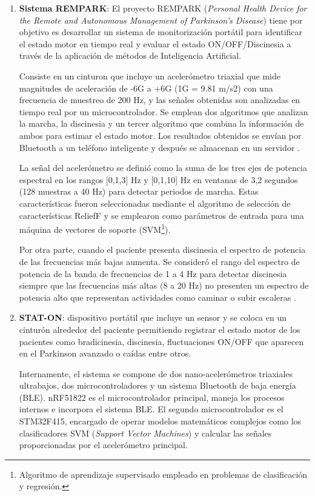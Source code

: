 \begin{enumerate}
    \item \textbf{Sistema REMPARK}: El proyecto REMPARK (\textit{Personal Health Device for the Remote and Autonomous Management of Parkinson's Disease}) tiene por objetivo es desarrollar un sistema de monitorización portátil para identificar el estado motor en tiempo real y evaluar el estado ON/OFF/Discinesia a través de la aplicación de métodos de Inteligencia Artificial.

    Consiste en un cinturon que incluye un acelerómetro triaxial que mide magnitudes de aceleración de -6G a +6G (1G = 9.81 m/s2) con una frecuencia de muestreo de 200 Hz, y las señales obtenidas son analizadas en tiempo real por un microcontrolador. Se emplean dos algoritmos que analizan la marcha, la discinesia y un tercer algoritmo que combina la información de ambos para estimar el estado motor. Los resultados obtenidos se envían por Bluetooth a un teléfono inteligente y después se almacenan en un servidor \cite{bayes2018holter, cabestany2013rempark}.

    La señal del acelerómetro se definió como la suma de los tres ejes de potencia espectral en los rangos [0,1,3] Hz y [0,1,10] Hz en ventanas de 3,2 segundos (128 muestras a 40 Hz) para detectar periodos de marcha. Estas características fueron seleccionadas mediante el algoritmo de selección de características ReliefF y se emplearon como parámetros de entrada para una máquina de vectores de soporte (SVM\footnote{Algoritmo de aprendizaje supervisado empleado en problemas de clasificación y regresión.}). 

    Por otra parte, cuando el paciente presenta discinesia  el espectro de potencia de las frecuencias más bajas aumenta. Se consideró el rango del espectro de potencia de la banda de frecuencias de 1 a 4 Hz para detectar discinesia siempre que las frecuencias más altas (8 a 20 Hz) no presenten un espectro de potencia alto que representan actividades como caminar o subir escaleras \cite{perez2016dopaminergic}.
    
    \item \textbf{STAT-ON}: dispositivo portátil que incluye un sensor y se coloca en un cinturón alrededor del paciente permitiendo registrar el estado motor de los pacientes  como bradicinesia, discinesia, fluctuaciones ON/OFF que aparecen en el Parkinson avanzado o caídas entre otros. 

    Internamente, el sistema se compone de dos nano-acelerómetros triaxiales ultrabajos, dos microcontroladores y un sistema Bluetooth de baja energía (BLE). nRF51822 es el microcontrolador principal, maneja los procesos internos e incorpora el sistema BLE. El segundo microcontrolador es el  STM32F415, encargado de operar modelos matemáticos complejos como los clasificadores SVM (\textit{Support Vector Machines}) y calcular las señales proporcionadas por el acelerómetro principal.


\end{enumerate}
